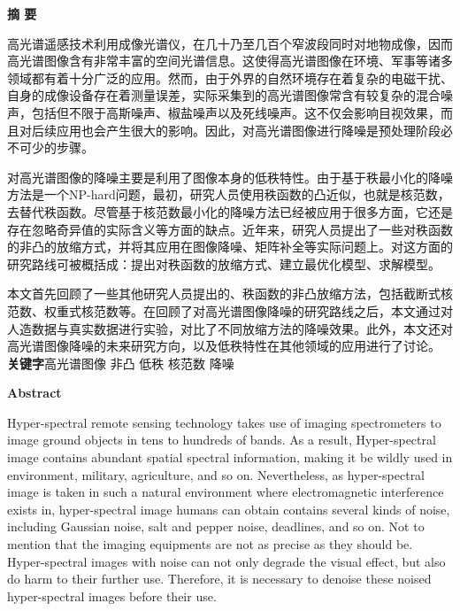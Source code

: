 \documentclass[12pt, a4paper]{article}
\begin{document}

	
\begin{center}
{\Large{\bf{摘 \quad 要}}}
\end{center}
\par 高光谱遥感技术利用成像光谱仪，在几十乃至几百个窄波段同时对地物成像，因而高光谱图像含有非常丰富的空间光谱信息。这使得高光谱图像在环境、军事等诸多领域都有着十分广泛的应用。然而，由于外界的自然环境存在着复杂的电磁干扰、自身的成像设备存在着测量误差，实际采集到的高光谱图像常含有较复杂的混合噪声，包括但不限于高斯噪声、椒盐噪声以及死线噪声。这不仅会影响目视效果，而且对后续应用也会产生很大的影响。因此，对高光谱图像进行降噪是预处理阶段必不可少的步骤。
\par 对高光谱图像的降噪主要是利用了图像本身的低秩特性。由于基于秩最小化的降噪方法是一个NP-hard问题，最初，研究人员使用秩函数的凸近似，也就是核范数，去替代秩函数。尽管基于核范数最小化的降噪方法已经被应用于很多方面，它还是存在忽略奇异值的实际含义等方面的缺点。近年来，研究人员提出了一些对秩函数的非凸的放缩方式，并将其应用在图像降噪、矩阵补全等实际问题上。对这方面的研究路线可被概括成：提出对秩函数的放缩方式、建立最优化模型、求解模型。
\par 本文首先回顾了一些其他研究人员提出的、秩函数的非凸放缩方法，包括截断式核范数、权重式核范数等。在回顾了对高光谱图像降噪的研究路线之后，本文通过对人造数据与真实数据进行实验，对比了不同放缩方法的降噪效果。此外，本文还对高光谱图像降噪的未来研究方向，以及低秩特性在其他领域的应用进行了讨论。
\\
{\bf{关键字}}\quad 高光谱图像 \quad 非凸 \quad 低秩 \quad 核范数 \quad 降噪
\newpage
\begin{center}
{\Large{\bf{Abstract}}}
\end{center}
\par Hyper-spectral remote sensing technology takes use of imaging spectrometers to image ground objects in tens to hundreds of bands. As a result, Hyper-spectral image contains abundant spatial spectral information, making it be wildly used in environment, military, agriculture, and so on. Nevertheless, as hyper-spectral image is taken in such a natural environment where electromagnetic interference exists in, hyper-spectral image humans can obtain contains several kinds of noise, including Gaussian noise, salt and pepper noise, deadlines, and so on. Not to mention that the imaging equipments are not as precise as they should be. Hyper-spectral images with noise can not only degrade the visual effect, but also do harm to their further use. Therefore, it is necessary to denoise these noised hyper-spectral images before their use.
\end{document}
